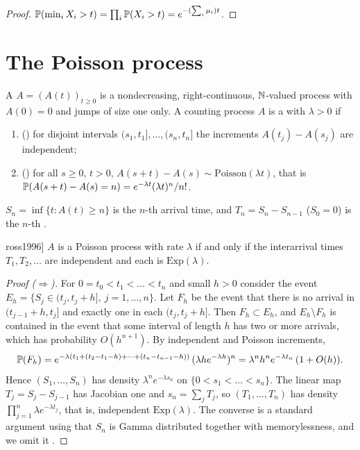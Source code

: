 \begin{proof}
$\mathbb{P}(\min_iX_i>t)=\prod_i\mathbb{P}(X_i>t)=e^{-(\sum_i\mu_i)t}$.
\end{proof}

\section{The Poisson process}

\begin{definition}\label{def:poisson}
A  $A=(A(t))_{t\ge0}$ is a nondecreasing, right-continuous,
$\mathbb{N}$-valued process with $A(0)=0$ and jumps of size one only.
A counting process $A$ is a  with  $\lambda>0$ if
\begin{enumerate}
\item () for disjoint intervals
  $(s_1,t_1],\dots,(s_n,t_n]$ the increments $A(t_j)-A(s_j)$ are independent;
\item () for all $s\ge0$, $t>0$,
  $A(s+t)-A(s)\sim\mathrm{Poisson}(\lambda t)$, that is
  $\mathbb{P}(A(s+t)-A(s)=n)=e^{-\lambda t}(\lambda t)^n/n!$.
\end{enumerate}
$S_n=\inf\{t:A(t)\ge n\}$ is the $n$-th arrival time, and $T_n=S_n-S_{n-1}$
($S_0=0$) is the $n$-th .
\end{definition}

\begin{theorem}[Exponential interarrival times \cite[\S2.2]{ross1996}]\label{L1:thm:interarrival}
$A$ is a Poisson process with rate $\lambda$ if and only if the interarrival times
$T_1,T_2,\dots$ are independent and each is $\mathrm{Exp}(\lambda)$.
\end{theorem}

\begin{proof}[Proof ($\Rightarrow$)]
For $0=t_0<t_1<\dots<t_n$ and small $h>0$ consider the event
$E_h=\{S_j\in(t_j,t_j+h],\ j=1,\dots,n\}$. Let $F_h$ be the event that there is no
arrival in $(t_{j-1}+h,t_j]$ and exactly one in each $(t_j,t_j+h]$. Then
$F_h\subset E_h$, and $E_h\setminus F_h$ is contained in the event that some interval
of length $h$ has two or more arrivals, which has probability $O(h^{n+1})$. By
independent and Poisson increments,
\[
  \mathbb{P}(F_h)=e^{-\lambda(t_1+(t_2-t_1-h)+\cdots+(t_n-t_{n-1}-h))}\,(\lambda h e^{-\lambda h})^n
  =\lambda^n h^n e^{-\lambda t_n}\,(1+O(h)).
\]
Hence $(S_1,\dots,S_n)$ has density $\lambda^ne^{-\lambda s_n}$ on
$\{0<s_1<\dots<s_n\}$. The linear map $T_j=S_j-S_{j-1}$ has Jacobian one and
$s_n=\sum_jT_j$, so $(T_1,\dots,T_n)$ has density $\prod_{j=1}^n\lambda e^{-\lambda t_j}$,
that is, independent $\mathrm{Exp}(\lambda)$. The converse is a standard argument
using that $S_n$ is Gamma distributed together with memorylessness, and we omit it
\cite[\S2.2]{ross1996}.
\end{proof}

